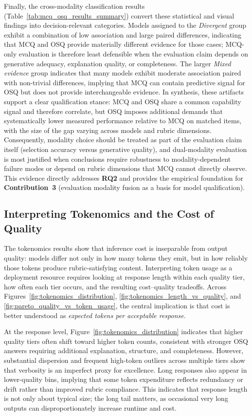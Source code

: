 Finally, the cross-modality classification results (Table~\ref{tab:mcq_osq_results_summary}) convert these statistical and visual findings into decision-relevant categories. Models assigned to the \emph{Divergent} group exhibit a combination of low association and large paired differences, indicating that MCQ and OSQ provide materially different evidence for those cases; MCQ-only evaluation is therefore least defensible when the evaluation claim depends on generative adequacy, explanation quality, or completeness. The larger \emph{Mixed evidence} group indicates that many models exhibit moderate association paired with non-trivial differences, implying that MCQ can contain predictive signal for OSQ but does not provide interchangeable evidence. In synthesis, these artifacts support a clear qualification stance: MCQ and OSQ share a common capability signal and therefore correlate, but OSQ imposes additional demands that systematically lower measured performance relative to MCQ on matched items, with the size of the gap varying across models and rubric dimensions. Consequently, modality choice should be treated as part of the evaluation claim itself (selection accuracy versus generative quality), and dual-modality evaluation is most justified when conclusions require robustness to modality-dependent failure modes or depend on rubric dimensions that MCQ cannot directly observe. This evidence directly addresses \textbf{RQ2} and provides the empirical foundation for \textbf{Contribution~3} (evaluation modality fusion as a basis for model qualification).

\subsection{Interpreting Tokenomics and the Cost of Quality}

The tokenomics results show that inference cost is inseparable from output quality: models differ not only in how many tokens they emit, but in how reliably those tokens produce rubric-satisfying content. Interpreting token usage as a deployment resource requires looking at response length within each quality tier, how often each tier occurs, and the resulting cost–quality tradeoffs. Across Figures~\ref{fig:tokenomics_distribution}, \ref{fig:tokenomics_length_vs_quality}, and \ref{fig:pareto_quality_vs_token_usage}, the central implication is that cost is better understood as \emph{expected tokens per acceptable response}.

At the response level, Figure~\ref{fig:tokenomics_distribution} indicates that higher quality tiers often shift toward higher token counts, consistent with stronger OSQ answers requiring additional explanation, structure, and completeness. However, substantial dispersion and frequent high-token outliers across multiple tiers show that verbosity is an imperfect proxy for excellence. Long responses also appear in lower-quality bins, implying that some token expenditure reflects redundancy or drift rather than improved rubric compliance. This indicates that response length is not only about typical size; the long tail matters, as occasional very long outputs can disproportionately increase runtime and cost. 

